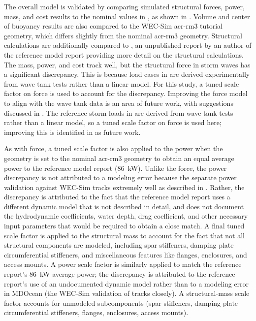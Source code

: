 The overall model is validated by comparing simulated structural forces, power, mass, and cost results to the nominal values in \citet{RM3}, as shown in .
\ifdefined\DISSERTATION
    Volume and center of buoyancy results are also compared to the WEC-Sim \gls{acr-rm3} tutorial geometry, which differs slightly from the nominal \gls{acr-rm3} geometry.
    Structural calculations are additionally compared to \citet{previsic_reference_2011}, an unpublished report by an author of the reference model report providing more detail on the structural calculations.
\fi
The mass, power, and cost track well, but the structural force in storm waves has a significant discrepancy.
\ifdefined\DISSERTATION
    This is because load cases in \citet{RM3} are derived experimentally from wave tank tests rather than a linear model.
    For this study, a tuned scale factor on force is used to account for the discrepancy.
    Improving the force model to align with the wave tank data is an area of future work, with suggestions discussed in .
\else
    The reference storm loads in \citet{RM3} are derived from wave-tank tests rather than a linear model, so a tuned scale factor on force is used here;
    improving this is identified in  as future work.
\fi

\ifdefined\DISSERTATION
    As with force, a tuned scale factor is also applied to the power when the geometry is set to the nominal \gls{acr-rm3} geometry to obtain an equal average power to the reference model report (86~kW).
    Unlike the force, the power discrepancy is not attributed to a modeling error because the separate power validation against WEC-Sim tracks extremely well as described in .
    Rather, the discrepancy is attributed to the fact that the reference model report uses a different dynamic model that is not described in detail, and does not document the hydrodynamic coefficients, water depth, drag coefficient, and other necessary input parameters that would be required to obtain a close match.
    A final tuned scale factor is applied to the structural mass to account for the fact that not all structural components are modeled, including spar stiffeners, damping plate circumferential stiffeners, and miscellaneous features like flanges, enclosures, and access mounts.
\else
    A power scale factor is similarly applied to match the reference report's 86~kW average power;
    the discrepancy is attributed to the reference report's use of an undocumented dynamic model rather than to a modeling error in MDOcean
    (the WEC-Sim validation of  tracks closely).
    A structural-mass scale factor accounts for unmodeled subcomponents (spar stiffeners, damping plate circumferential stiffeners, flanges, enclosures, access mounts).
\fi

